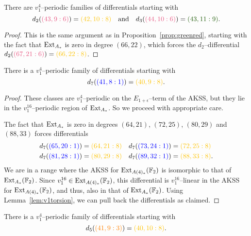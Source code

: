 \begin{prop}\label{prop:pinkyellow}
There are $v_1^4$--periodic families of differentials starting with
\[d_2( {\color{lavenderrose}(43,9:6)}) = {\color{goldenpoppy}(42,10:8)} \ \ \ \text{and} \ \ \  d_3( {\color{lavenderrose}(44,10:6)}) = {\color{seagreen}(43,11:9)} .\]
\end{prop}
\begin{proof}
This is the same argument as in Proposition~\ref{prop:greenred}, starting with the fact that $\operatorname{Ext}_{A_*}$ is zero in degree $(66,22)$, which forces the $d_2$--differential $d_2({\color{lavenderrose}(67,21:6)}) = {\color{goldenpoppy}(66,22:8)}$.
\end{proof}


\begin{prop}\label{prop:blueyellow}
There is a $v_1^{4}$--periodic family of differentials starting with
\[d_7( {\color{blue}(41,8:1)}) = {\color{goldenpoppy}(40,9:8)} .\]
\end{prop}
\begin{proof}
These classes are $v_1^4$--periodic on the $E_{1+\epsilon}$--term of the AKSS, but they lie in the $v_1^{16}$--periodic region of $\operatorname{Ext}_{A_*}$. So we proceed with appropriate care.

The fact that $\operatorname{Ext}_{A_*}$ is zero in degrees $(64,21)$, $(72,25)$, $(80,29)$ and $(88,33)$ forces differentials
\begin{align*}
d_7( {\color{blue}(65,20:1)}) &= {\color{goldenpoppy}(64,21:8)} &
d_7( {\color{blue}(73,24:1)}) &= {\color{goldenpoppy}(72,25:8)} \\
d_7( {\color{blue}(81,28:1)}) &= {\color{goldenpoppy}(80,29:8)} &
d_7( {\color{blue}(89,32:1)}) &= {\color{goldenpoppy}(88,33: 8)}.
\end{align*}
We are in a range where the AKSS for $\operatorname{Ext}_{A(4)_*}(\mathbb{F}_2)$ is isomorphic to that of $\operatorname{Ext}_{A_*}(\mathbb{F}_2)$. Since $v_1^{16} \in
\operatorname{Ext}_{A(4)_*}(\mathbb{F}_2)$, this differential is $v_1^{16}$--linear in the AKSS for $\operatorname{Ext}_{A(4)_*}(\mathbb{F}_2)$, and thus, also in that of $\operatorname{Ext}_{A_*}(\mathbb{F}_2)$. Using  Lemma~\ref{lem:v1torsion}, we can pull back the differentials as claimed.
\end{proof}


\begin{prop}\label{prop:orangeyellowred}
There is a $v_1^{4}$--periodic family of differentials starting with
\[d_5( {\color{orange}(41,9:3)}) = {\color{goldenpoppy}(40,10:8)} .\]
\end{prop}


